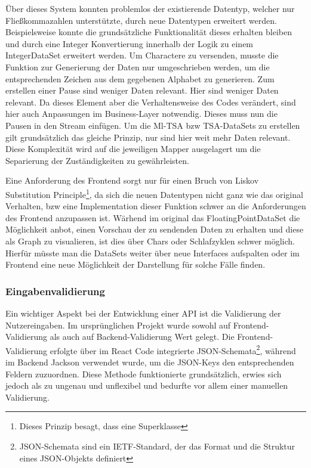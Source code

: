 Über dieses System konnten problemlos der existierende Datentyp, welcher nur Fließkommazahlen unterstützte, durch neue Datentypen erweitert werden. Beispielsweise konnte die grundsätzliche Funktionalität dieses erhalten bleiben und durch eine Integer Konvertierung innerhalb der Logik zu einem IntegerDataSet erweitert werden.
Um Charactere zu versenden, musste die Funktion zur Generierung der Daten nur umgeschrieben werden, um die entsprechenden Zeichen aus dem gegebenen Alphabet zu generieren. Zum erstellen einer Pause sind weniger Daten relevant.
Hier sind weniger Daten relevant. Da dieses Element aber die Verhaltensweise des Codes verändert, sind hier auch Anpassungen im Business-Layer notwendig. Dieses muss nun die Pausen in den Stream einfügen.
Um die Ml-TSA bzw TSA-DataSets zu erstellen gilt grundsätzlich das gleiche Prinzip, nur sind hier weit mehr Daten relevant. Diese Komplexität wird auf die jeweiligen Mapper ausgelagert um die Separierung der Zuständigkeiten zu gewährleisten.

Eine Anforderung des Frontend sorgt nur für einen Bruch von Liskov Substitution Principle\footnote{Dieses Prinzip besagt, dass eine Superklasse }, da sich die neuen Datentypen nicht ganz wie das original Verhalten, bzw eine Implementation dieser Funktion schwer an die Anforderungen des Frontend anzupassen ist.
Wärhend im original das FloatingPointDataSet die Möglichkeit anbot, einen Vorschau der zu sendenden Daten zu erhalten und diese als Graph zu visualieren, ist dies über Chars oder Schlafzyklen schwer möglich. Hierfür müsste man die DataSets weiter über neue Interfaces aufspalten oder im Frontend eine neue Möglichkeit der Darstellung für solche Fälle finden.



\subsubsection{Eingabenvalidierung}
\label{sec:javaInputValidation}
Ein wichtiger Aspekt bei der Entwicklung einer API ist die Validierung der Nutzereingaben. Im ursprünglichen Projekt wurde sowohl auf Frontend-Validierung als auch auf Backend-Validierung Wert gelegt. 
Die Frontend-Validierung erfolgte über im React Code integrierte JSON-Schemata\footnote{JSON-Schemata sind ein IETF-Standard, der das Format und die Struktur eines JSON-Objekts definiert}, während im 
Backend Jackson verwendet wurde, um die JSON-Keys den entsprechenden Feldern zuzuordnen. Diese Methode funktionierte grundsätzlich, erwies sich jedoch als zu ungenau und unflexibel und bedurfte vor allem einer manuellen Validierung.


